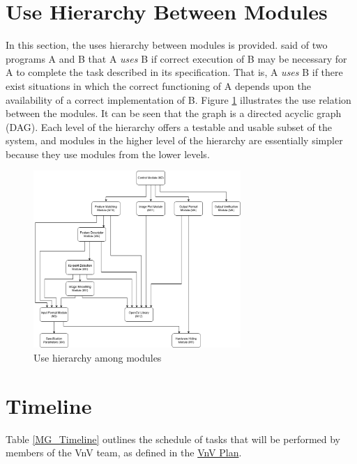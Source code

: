 \documentclass[12pt, titlepage]{article}
\begin{document}
\section{Use Hierarchy Between Modules} \label{SecUse}

In this section, the uses hierarchy between modules is
provided. \citet{Parnas1978} said of two programs A and B that A {\em uses} B if
correct execution of B may be necessary for A to complete the task described in
its specification. That is, A {\em uses} B if there exist situations in which
the correct functioning of A depends upon the availability of a correct
implementation of B.  Figure \ref{FigUH} illustrates the use relation between
the modules. It can be seen that the graph is a directed acyclic graph
(DAG). Each level of the hierarchy offers a testable and usable subset of the
system, and modules in the higher level of the hierarchy are essentially simpler
because they use modules from the lower levels.

\begin{figure}[H]
\centering
\includegraphics[width=0.7\textwidth]{UsesHierarchy.png}
\caption{Use hierarchy among modules}
\label{FigUH}
\end{figure}

\section{Timeline}
Table \ref{MG_Timeline} outlines the schedule of tasks that will be performed by members of the VnV team, as defined in 
the \href{https://github.com/KiranSingh15/CAS-741-Image-Correspondences/blob/main/docs/VnVPlan/VnVPlan.pdf}{VnV Plan}.
\end{document}
